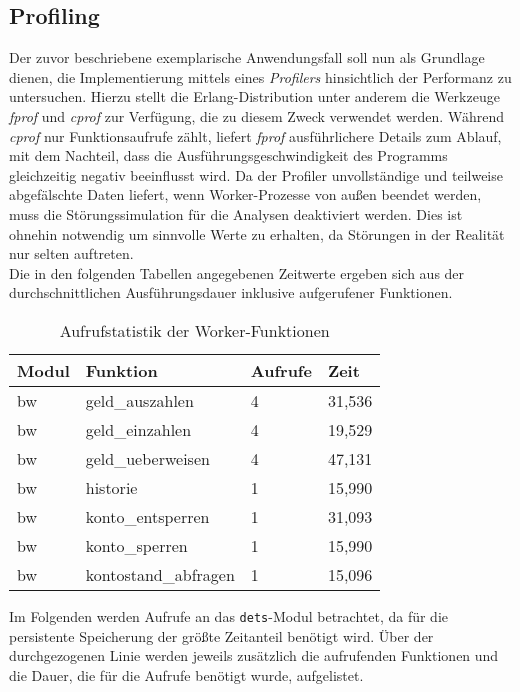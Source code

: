 \subsection{Profiling}
Der zuvor beschriebene exemplarische Anwendungsfall soll nun als Grundlage dienen, die Implementierung mittels eines \textit{Profilers} hinsichtlich der Performanz zu untersuchen. Hierzu stellt die Erlang-Distribution unter anderem die Werkzeuge \textit{fprof} und \textit{cprof} zur Verfügung, die zu diesem Zweck verwendet werden. Während \textit{cprof} nur Funktionsaufrufe zählt, liefert \textit{fprof} ausführlichere Details zum Ablauf, mit dem Nachteil, dass die Ausführungsgeschwindigkeit des Programms gleichzeitig negativ beeinflusst wird. Da der Profiler unvollständige und teilweise abgefälschte Daten liefert, wenn Worker-Prozesse von außen beendet werden, muss die Störungssimulation für die Analysen deaktiviert werden. Dies ist ohnehin notwendig um sinnvolle Werte zu erhalten, da Störungen in der Realität nur selten auftreten.\\
Die in den folgenden Tabellen angegebenen Zeitwerte ergeben sich aus der durchschnittlichen Ausführungsdauer inklusive aufgerufener Funktionen.

\begin{table}[H]
\caption{Aufrufstatistik der Worker-Funktionen}
\begin{center}
	\begin{tabular}{p{1.2cm}|p{5cm}|p{2cm}|p{2cm}}
		Modul & Funktion & Aufrufe & Zeit \\
		\hline
		\hline
		bw & geld\_auszahlen & 4 & 31,536 \\
		bw & geld\_einzahlen & 4 & 19,529 \\
		bw & geld\_ueberweisen & 4 & 47,131 \\
		bw & historie & 1 & 15,990 \\
		bw & konto\_entsperren & 1 & 31,093 \\
		bw & konto\_sperren & 1 & 15,990 \\
		bw & kontostand\_abfragen & 1 & 15,096 \\
	\end{tabular}
\end{center}
\end{table}
Im Folgenden werden Aufrufe an das \texttt{dets}-Modul betrachtet, da für die persistente Speicherung der größte Zeitanteil benötigt wird. Über der durchgezogenen Linie werden jeweils zusätzlich die aufrufenden Funktionen und die Dauer, die für die Aufrufe benötigt wurde, aufgelistet.

